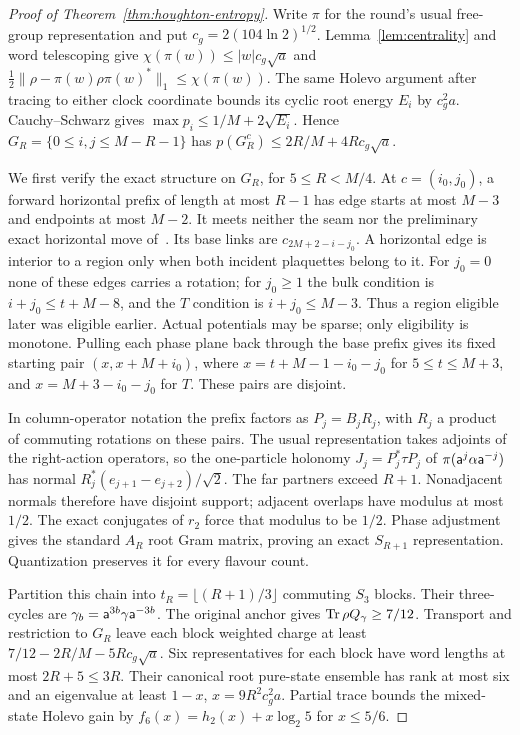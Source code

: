 \begin{proof}[Proof of Theorem~\ref{thm:houghton-entropy}]
Write $\pi$ for the round's usual free-group representation and
put $c_g=2(104\ln2)^{1/2}$. Lemma~\ref{lem:centrality} and
word telescoping give
$\chi(\pi(w))\leq |w|c_g\sqrt a$ and
$\tfrac12\|\rho-\pi(w)\rho\pi(w)^*\|_1\leq\chi(\pi(w))$.
The same Holevo argument after tracing to either clock coordinate
bounds its cyclic root energy $E_i$ by $c_g^2a$.
Cauchy--Schwarz gives $\max p_i\leq1/M+2\sqrt{E_i}$.
Hence $G_R=\{0\leq i,j\leq M-R-1\}$ has
$p(G_R^c)\leq2R/M+4Rc_g\sqrt a$.

We first verify the exact structure on $G_R$, for $5\leq R<M/4$.
At $c=(i_0,j_0)$, a forward horizontal prefix of length at most
$R-1$ has edge starts at most $M-3$ and endpoints at most $M-2$.
It meets neither the seam nor the preliminary exact horizontal move
of~\cite[Section~6.2]{DouglasMghirbiA}. Its base links are
$c_{2M+2-i-j_0}$. A horizontal edge is interior to a region only
when both incident plaquettes belong to it. For $j_0=0$ none of
these edges carries a rotation; for $j_0\geq1$ the bulk condition is
$i+j_0\leq t+M-8$, and the $T$ condition is $i+j_0\leq M-3$.
Thus a region eligible later was eligible earlier. Actual potentials
may be sparse; only eligibility is monotone.
Pulling each phase plane back through the base prefix gives its
fixed starting pair $(x,x+M+i_0)$, where
$x=t+M-1-i_0-j_0$ for $5\leq t\leq M+3$, and
$x=M+3-i_0-j_0$ for $T$. These pairs are disjoint.

In column-operator notation the prefix factors as $P_j=B_jR_j$,
with $R_j$ a product of commuting rotations on these pairs.
The usual representation takes adjoints of the right-action
operators, so the one-particle holonomy $J_j=P_j^*\tau P_j$ of
$\pi(\mathsf a^j\alpha\mathsf a^{-j})$ has normal
$R_j^*(e_{j+1}-e_{j+2})/\sqrt2$.
The far partners exceed $R+1$. Nonadjacent normals therefore have
disjoint support; adjacent overlaps have modulus at most $1/2$.
The exact conjugates of $r_2$ force that modulus to be $1/2$.
Phase adjustment gives the standard $A_R$ root Gram matrix, proving
an exact $S_{R+1}$ representation. Quantization preserves it for
every flavour count.

Partition this chain into $t_R=\lfloor(R+1)/3\rfloor$ commuting
$S_3$ blocks. Their three-cycles are
$\gamma_b=\mathsf a^{3b}\gamma\mathsf a^{-3b}$.
The original anchor gives $\operatorname{Tr}\rho Q_\gamma\geq7/12$.
Transport and restriction to $G_R$ leave each block weighted charge
at least $7/12-2R/M-5Rc_g\sqrt a$.
Six representatives for each block have word lengths at most
$2R+5\leq3R$. Their canonical root pure-state ensemble has rank
at most six and an eigenvalue at least $1-x$,
$x=9R^2c_g^2a$. Partial trace bounds the mixed-state Holevo gain by
$f_6(x)=h_2(x)+x\log_2 5$ for $x\leq5/6$.


\end{proof}
